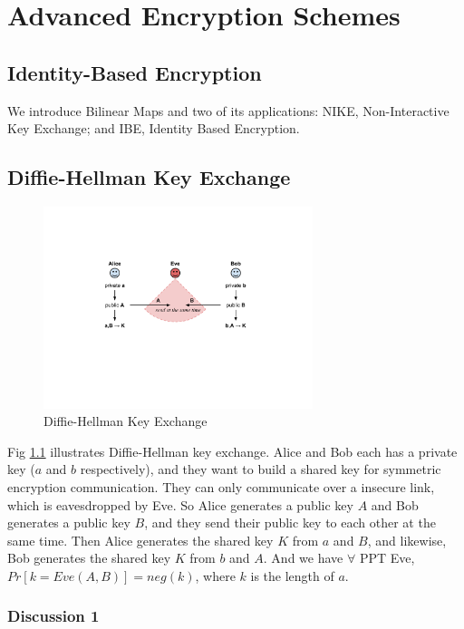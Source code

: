 \chapter{Advanced Encryption Schemes}
\section{Identity-Based Encryption}

We introduce Bilinear Maps and two of its applications: NIKE, Non-Interactive Key Exchange; and IBE, Identity Based Encryption.


\section{Diffie-Hellman Key Exchange}

\begin{figure}
\label{fig:dh}
\centering
  \includegraphics[width=0.7\textwidth]{Old Scribe Notes/fig1.pdf}
\caption{Diffie-Hellman Key Exchange}
\end{figure}


Fig \ref{fig:dh} illustrates Diffie-Hellman key exchange. Alice and Bob each has a private key ($a$ and $b$ respectively), and they want to build a shared key for symmetric encryption communication. They can only communicate over a insecure link, which is eavesdropped by Eve.
So Alice generates a public key $A$ and Bob generates a public key $B$, and they send their public key to each other at the same time. Then Alice generates the shared key $K$ from $a$ and $B$, and likewise, Bob generates the shared key $K$ from $b$ and $A$.
And we have $\forall$ PPT Eve, $Pr[k=Eve(A,B)]=neg(k)$, where $k$ is the length of $a$.


\subsection{Discussion 1}


